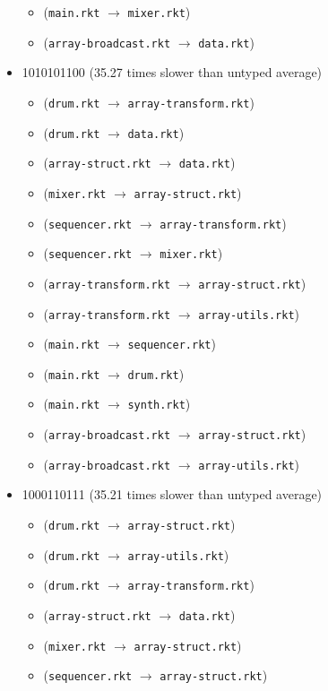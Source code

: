 \documentclass{article}
\newcommand{\mono}[1]{\texttt{#1}}
\begin{document}
\begin{itemize}
\begin{itemize}
  \item (\mono{main.rkt} $\rightarrow$ \mono{mixer.rkt})
  \item (\mono{array-broadcast.rkt} $\rightarrow$ \mono{data.rkt})
  \end{itemize}
\item 1010101100 (35.27 times slower than untyped average)
  \begin{itemize}
  \item (\mono{drum.rkt} $\rightarrow$ \mono{array-transform.rkt})
  \item (\mono{drum.rkt} $\rightarrow$ \mono{data.rkt})
  \item (\mono{array-struct.rkt} $\rightarrow$ \mono{data.rkt})
  \item (\mono{mixer.rkt} $\rightarrow$ \mono{array-struct.rkt})
  \item (\mono{sequencer.rkt} $\rightarrow$ \mono{array-transform.rkt})
  \item (\mono{sequencer.rkt} $\rightarrow$ \mono{mixer.rkt})
  \item (\mono{array-transform.rkt} $\rightarrow$ \mono{array-struct.rkt})
  \item (\mono{array-transform.rkt} $\rightarrow$ \mono{array-utils.rkt})
  \item (\mono{main.rkt} $\rightarrow$ \mono{sequencer.rkt})
  \item (\mono{main.rkt} $\rightarrow$ \mono{drum.rkt})
  \item (\mono{main.rkt} $\rightarrow$ \mono{synth.rkt})
  \item (\mono{array-broadcast.rkt} $\rightarrow$ \mono{array-struct.rkt})
  \item (\mono{array-broadcast.rkt} $\rightarrow$ \mono{array-utils.rkt})
  \end{itemize}
\item 1000110111 (35.21 times slower than untyped average)
  \begin{itemize}
  \item (\mono{drum.rkt} $\rightarrow$ \mono{array-struct.rkt})
  \item (\mono{drum.rkt} $\rightarrow$ \mono{array-utils.rkt})
  \item (\mono{drum.rkt} $\rightarrow$ \mono{array-transform.rkt})
  \item (\mono{array-struct.rkt} $\rightarrow$ \mono{data.rkt})
  \item (\mono{mixer.rkt} $\rightarrow$ \mono{array-struct.rkt})
  \item (\mono{sequencer.rkt} $\rightarrow$ \mono{array-struct.rkt})

\end{itemize}
\end{itemize}
\end{document}
